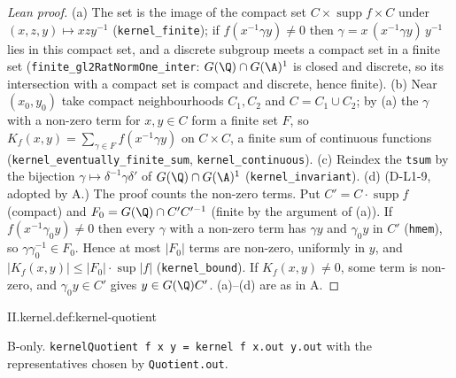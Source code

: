 \begin{proof}[Lean proof]
(a) The set is the image of the compact set $C\times\operatorname{supp}f\times C$ under $(x,z,y)\mapsto xzy^{-1}$ (\texttt{kernel\_finite}); if $f(x^{-1}\gamma y)\ne0$ then $\gamma=x\,(x^{-1}\gamma y)\,y^{-1}$ lies in this compact set, and a discrete subgroup meets a compact set in a finite set (\texttt{finite\_gl2RatNormOne\_inter}: $G(\Q)\cap G(\A)^1$ is closed and discrete, so its intersection with a compact set is compact and discrete, hence finite). (b) Near $(x_0,y_0)$ take compact neighbourhoods $C_1,C_2$ and $C=C_1\cup C_2$; by (a) the $\gamma$ with a non-zero term for $x,y\in C$ form a finite set $F$, so $K_f(x,y)=\sum_{\gamma\in F}f(x^{-1}\gamma y)$ on $C\times C$, a finite sum of continuous functions (\texttt{kernel\_eventually\_finite\_sum}, \texttt{kernel\_continuous}). (c) Reindex the \texttt{tsum} by the bijection $\gamma\mapsto\delta^{-1}\gamma\delta'$ of $G(\Q)\cap G(\A)^1$ (\texttt{kernel\_invariant}). (d) (D-L1-9, adopted by A.) The proof counts the non-zero terms. Put $C'=C\cdot\operatorname{supp}f$ (compact) and $F_0=G(\Q)\cap C'C'^{-1}$ (finite by the argument of (a)). If $f(x^{-1}\gamma_0y)\neq0$ then every $\gamma$ with a non-zero term has $\gamma y$ and $\gamma_0y$ in $C'$ (\texttt{hmem}), so $\gamma\gamma_0^{-1}\in F_0$. Hence at most $|F_0|$ terms are non-zero, uniformly in $y$, and $|K_f(x,y)|\le|F_0|\cdot\sup|f|$ (\texttt{kernel\_bound}). If $K_f(x,y)\ne0$, some term is non-zero, and $\gamma_0y\in C'$ gives $y\in G(\Q)C'$. (a)--(d) are as in A.
\end{proof}

\begin{definition}
\bonly
{}
\end{definition}
\begin{tfformal}{II.kernel.def:kernel-quotient}
\begin{tffidelity}
B-only. \texttt{kernelQuotient f x y = kernel f x.out y.out} with the representatives chosen by \texttt{Quotient.out}.
\end{tffidelity}
\end{tfformal}

